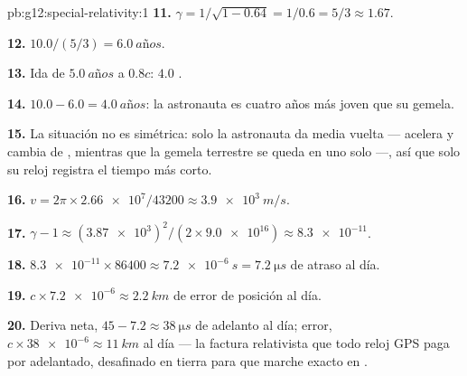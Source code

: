 \begin{solution}{pb:g12:special-relativity:1}
\textbf{11.} $\gamma = 1/\sqrt{1 - 0.64} = 1/0.6 = 5/3 \approx 1.67$.

\textbf{12.} $10.0/(5/3) = \qty{6.0}{años}$.

\textbf{13.} Ida de $\qty{5.0}{años}$ a $0.8c$: $4.0$ .

\textbf{14.} $10.0 - 6.0 = \qty{4.0}{años}$: la astronauta es cuatro
años más joven que su gemela.

\textbf{15.} La situación no es simétrica: solo la astronauta da media
vuelta --- acelera y cambia de , mientras que la gemela
terrestre se queda en uno solo ---, así que solo su reloj registra el
tiempo más corto.

\textbf{16.} $v = 2\pi \times \num{2.66e7}/\num{43200} \approx
\qty{3.9e3}{m/s}$.

\textbf{17.} $\gamma - 1 \approx (\num{3.87e3})^2/(2 \times
\num{9.0e16}) \approx \num{8.3e-11}$.

\textbf{18.} $\num{8.3e-11} \times \num{86400} \approx \qty{7.2e-6}{s}
= \qty{7.2}{\micro s}$ de atraso al día.

\textbf{19.} $c \times \num{7.2e-6} \approx \qty{2.2}{km}$ de error de
posición al día.

\textbf{20.} Deriva neta, $45 - 7.2 \approx \qty{38}{\micro s}$ de
adelanto al día; error,
$c \times \num{38e-6} \approx \qty{11}{km}$ al día --- la factura
relativista que todo reloj GPS paga por adelantado, desafinado en tierra
para que marche exacto en .
\end{solution}
